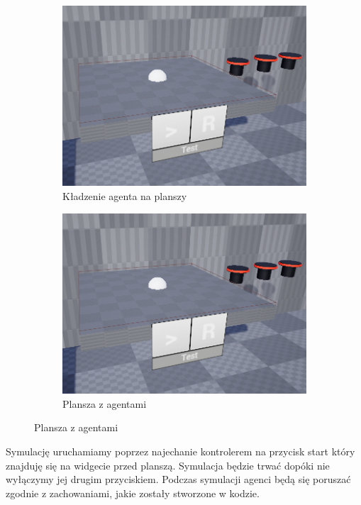 \documentclass[a4paper,12pt,reqno]{article}
\begin{document}
\begin{figure}[H]%
	\centering
	\begin{subfigure}{.5\textwidth}
		\centering
		\includegraphics[width=0.8\linewidth]{graphics//agent/AgentInUE_1.png}
		\caption{Kładzenie agenta na planszy}	
		\label{ref:subref_a}
	\end{subfigure}%
	\begin{subfigure}{.5\textwidth}
		\centering
		\includegraphics[width=0.8\linewidth]{graphics//agent/AgentInUE_1.png}
		\caption{Plansza z agentami}
		\label{ref:subref_b}
	\end{subfigure}%
\label{ref:ref}
\end{figure}

Symulację uruchamiamy poprzez najechanie kontrolerem na przycisk start który znajduję się na widgecie przed planszą. Symulacja będzie trwać dopóki nie wyłączymy jej drugim przyciskiem. Podczas symulacji agenci będą się poruszać zgodnie z zachowaniami, jakie zostały stworzone w kodzie.
\end{document}
